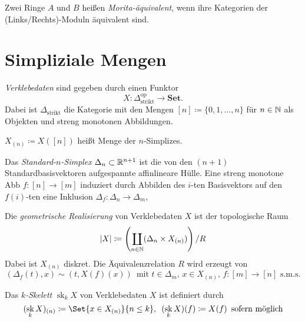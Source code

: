 \documentclass{cheat-sheet}
\newcommand{\SetC}{\mathbf{Set}} %
\newcommand{\op}{\mathrm{op}} %
\DeclareMathOperator{\sk}{sk} %
\begin{document}


\begin{defn}
  Zwei Ringe $A$ und $B$ heißen \emph{Morita-äquivalent}, wenn ihre Kategorien der (Links/Rechts)-Moduln äquivalent sind.
\end{defn}

\section{Simpliziale Mengen}


\begin{defn}
  \emph{Verklebedaten} sind gegeben durch einen Funktor
  \[ X : \Delta_{\text{strikt}}^\op \to \SetC. \]
  Dabei ist $\Delta_{\text{strikt}}$ die Kategorie mit den Mengen
  $[n] \coloneqq \{ 0, 1, \ldots, n \}$ für $n \in \mathbb{N}$ als Objekten und streng monotonen Abbildungen.
\end{defn}

\begin{nota}
  $X_{(n)} \coloneqq X([n])$ heißt Menge der $n$-Simplizes.
\end{nota}

\begin{defn}
  Das \emph{Standard-$n$-Simplex} $\Delta_n \subset \mathbb{R}^{n+1}$ ist die von den $(n{+}1)$ Standardbasisvektoren aufgespannte affinlineare Hülle. Eine streng monotone Abb $f : [n] \to [m]$ induziert durch Abbilden des $i$-ten Basisvektors auf den $f(i)$-ten eine Inklusion $\Delta_f : \Delta_n \to \Delta_m$, 
\end{defn}

\begin{defn}
  Die \emph{geometrische Realisierung} von Verklebedaten $X$ ist der topologische Raum
  \[ \lvert X\rvert \coloneqq \left( \coprod_{n \in \mathbb{N}} (\Delta_n \times X_{(n)}) \right) / R \]
  Dabei ist $X_{(n)}$ diskret. Die Äquivalenzrelation $R$ wird erzeugt von
  \[
    (\Delta_f(t), x) \sim (t, X(f)(x)) \enspace
    \text{mit $t \in \Delta_m$, $x \in X_{(n)}$, $f : [m] {\to} [n]$ s.m.s.}
  \]
\end{defn}


\begin{defn}
  Das \emph{$k$-Skelett} $\sk_k X$ von Verklebedaten $X$ ist definiert durch
  \[
    (\sk_k X)_{(n)} \coloneqq
    \Set{ x \in X_{(n)} }{ n \leq k }, \enspace
    (\sk_k X)(f) \coloneqq X(f) \enspace \text{sofern möglich}
  \]
\end{defn}
\end{document}
